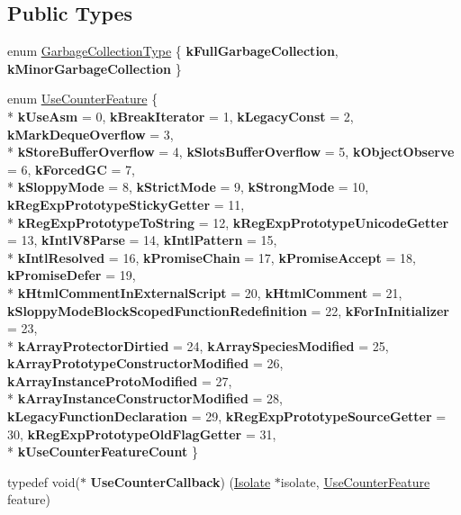 \subsection*{Public Types}
\begin{DoxyCompactItemize}
\item 
enum \hyperlink{classv8_1_1Isolate_a5ae00cc99d8aca148c6f5f9698c432c9}{Garbage\+Collection\+Type} \{ {\bfseries k\+Full\+Garbage\+Collection}, 
{\bfseries k\+Minor\+Garbage\+Collection}
 \}
\item 
enum \hyperlink{classv8_1_1Isolate_aed6909379c3f2820cb3084710b73385d}{Use\+Counter\+Feature} \{ \\*
{\bfseries k\+Use\+Asm} = 0, 
{\bfseries k\+Break\+Iterator} = 1, 
{\bfseries k\+Legacy\+Const} = 2, 
{\bfseries k\+Mark\+Deque\+Overflow} = 3, 
\\*
{\bfseries k\+Store\+Buffer\+Overflow} = 4, 
{\bfseries k\+Slots\+Buffer\+Overflow} = 5, 
{\bfseries k\+Object\+Observe} = 6, 
{\bfseries k\+Forced\+GC} = 7, 
\\*
{\bfseries k\+Sloppy\+Mode} = 8, 
{\bfseries k\+Strict\+Mode} = 9, 
{\bfseries k\+Strong\+Mode} = 10, 
{\bfseries k\+Reg\+Exp\+Prototype\+Sticky\+Getter} = 11, 
\\*
{\bfseries k\+Reg\+Exp\+Prototype\+To\+String} = 12, 
{\bfseries k\+Reg\+Exp\+Prototype\+Unicode\+Getter} = 13, 
{\bfseries k\+Intl\+V8\+Parse} = 14, 
{\bfseries k\+Intl\+Pattern} = 15, 
\\*
{\bfseries k\+Intl\+Resolved} = 16, 
{\bfseries k\+Promise\+Chain} = 17, 
{\bfseries k\+Promise\+Accept} = 18, 
{\bfseries k\+Promise\+Defer} = 19, 
\\*
{\bfseries k\+Html\+Comment\+In\+External\+Script} = 20, 
{\bfseries k\+Html\+Comment} = 21, 
{\bfseries k\+Sloppy\+Mode\+Block\+Scoped\+Function\+Redefinition} = 22, 
{\bfseries k\+For\+In\+Initializer} = 23, 
\\*
{\bfseries k\+Array\+Protector\+Dirtied} = 24, 
{\bfseries k\+Array\+Species\+Modified} = 25, 
{\bfseries k\+Array\+Prototype\+Constructor\+Modified} = 26, 
{\bfseries k\+Array\+Instance\+Proto\+Modified} = 27, 
\\*
{\bfseries k\+Array\+Instance\+Constructor\+Modified} = 28, 
{\bfseries k\+Legacy\+Function\+Declaration} = 29, 
{\bfseries k\+Reg\+Exp\+Prototype\+Source\+Getter} = 30, 
{\bfseries k\+Reg\+Exp\+Prototype\+Old\+Flag\+Getter} = 31, 
\\*
{\bfseries k\+Use\+Counter\+Feature\+Count}
 \}
\item 
typedef void($\ast$ {\bfseries Use\+Counter\+Callback}) (\hyperlink{classv8_1_1Isolate}{Isolate} $\ast$isolate, \hyperlink{classv8_1_1Isolate_aed6909379c3f2820cb3084710b73385d}{Use\+Counter\+Feature} feature)\hypertarget{classv8_1_1Isolate_a7537ead98ee88eec2976348ba992935c}{}\label{classv8_1_1Isolate_a7537ead98ee88eec2976348ba992935c}


\end{DoxyCompactItemize}
